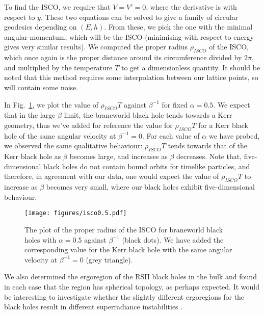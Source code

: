 \documentclass[%
 reprint,
 amsmath,amssymb,
 aps,
]{revtex4-2}
\begin{document}
To find the ISCO, we require that $V = V' = 0$, where the derivative is with respect to $y$. These two equations can be solved to give a family of circular geodesics depending on $(E,h)$. From these, we pick the one with the minimal angular momentum, which will be the ISCO (minimising with respect to energy gives very similar results). We computed the proper radius $\rho_{ISCO}$ of the ISCO, which once again is the proper distance around its circumference divided by $2\pi$, and multiplied by the temperature $T$ to get a dimensionless quantity. It should be noted that this method requires some interpolation between our lattice points, so will contain some noise.

In Fig.~\ref{fig:isco}, we plot the value of $\rho_{ISCO}T$ against $\beta^{-1}$ for fixed $\alpha=0.5$. We expect that in the large $\beta$ limit, the braneworld black hole tends towards a Kerr geometry, thus we've added for reference the value for $\rho_{ISCO}T$ for a Kerr black hole of the same angular velocity at $\beta^{-1}=0$. For each value of $\alpha$ we have probed, we observed the same qualitative behaviour: $\rho_{ISCO}T$ tends towards that of the Kerr black hole as $\beta$ becomes large, and increases as $\beta$ decreases. Note that, five-dimensional black holes do not contain bound orbits for timelike particles, and therefore, in agreement with our data, one would expect the value of $\rho_{ISCO}T$ to increase as $\beta$ becomes very small, where our black holes exhibit five-dimensional behaviour.
\begin{figure}[b]
\texttt{[image: figures/isco0.5.pdf]}
\caption{\label{fig:isco} The plot of the proper radius of the ISCO for braneworld black holes with $\alpha=0.5$ against $\beta^{-1}$ (black dots). We have added the corresponding value for the Kerr black hole with the same angular velocity at $\beta^{-1}=0$ (grey triangle).}
\end{figure}

We also determined the ergoregion of the RSII black holes in the bulk and found in each case that the region has spherical topology, as perhaps expected. It would be interesting to investigate whether the slightly different ergoregions for the black holes result in different superradiance instabilities \cite{Zouros:1979iw,Detweiler:1980uk}.
\end{document}

